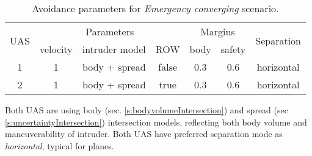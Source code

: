 \begin{table}[H]
    \centering
    \begin{tabular}{c||c|c|c||c|c||c}
        \multirow{2}{*}{UAS} & \multicolumn{3}{c||}{Parameters} & \multicolumn{2}{c||}{Margins} & \multirow{2}{*}{Separation}                                            \\\cline{2-6}
                             & velocity & intruder model & ROW        & body & safety \\\hline\hline
        1                    & 1        & body + spread  & false            & 0.3         & 0.6           & horizontal\\\hline
        2                    & 1        & body + spread  & true             & 0.3         & 0.6  & horizontal          \\
    \end{tabular}
    \caption{Avoidance parameters for  \emph{Emergency converging} scenario.}
    \label{tab:aboidanceParametersForEmergencyConvergingScenario}
\end{table}

\begin{note}
 Both UAS are using  body (sec. \ref{s:bodyvolumeIntersection}) and spread (sec \ref{s:uncertaintyIntersection}) intersection models, reflecting both body volume and maneuverability  of intruder. Both UAS have preferred separation mode as \emph{horizontal}, typical for planes.
\end{note}

